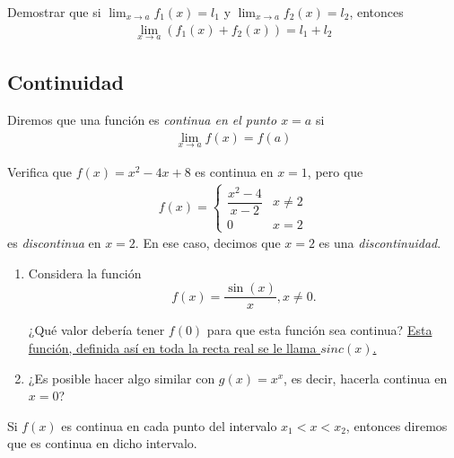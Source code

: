 \begin{resuelto}
	Demostrar que si $\lim_{x\to a}f_{1}(x)=l_{1}$ y $\lim_{x\to a}f_{2}(x)=l_{2}$, entonces
	\begin{align}
		\lim_{x\to a}\left( f_{1}(x)+f_{2}(x) \right)=l_{1}+l_{2}
	\end{align}
\end{resuelto}


\subsection{Continuidad}

  Diremos que una función es \emph{continua en el punto $x=a$} si
  \begin{align}
   \lim_{x\to a} f(x)=f(a)
   \end{align}

  \begin{resuelto}
   Verifica que $f(x)=x^{2}-4x+8$ es continua en $x=1$, pero que
   \begin{align}
   f(x)=
    \begin{cases}
\dfrac{x^2-4}{x-2}& x\neq 2\\
0 & x= 2
\end{cases}
    \end{align}
    es \emph{discontinua} en $x=2$.    En ese caso, decimos que $x=2$ es una \emph{discontinuidad}.
  \end{resuelto}

\begin{resuelto}

 \begin{enumerate}
 	\item Considera la función
 	\[ f(x) = \dfrac{\sin(x)}{x}, x\neq 0 .\]

 	¿Qué valor debería tener $ f(0) $ para que esta función sea continua? \href{https://mathworld.wolfram.com/SincFunction.html}{Esta función, definida así en toda la recta real se le llama $ sinc(x) $. }
 	\item ¿Es posible hacer algo similar con
 	$ g(x) = x^x $, es decir, hacerla continua en $ x=0 $?
 \end{enumerate}
\end{resuelto}

\begin{definicion}
	Si $f(x)$ es continua en cada punto del intervalo $x_{1}<x<x_{2}$, entonces diremos que es continua en dicho intervalo.
\end{definicion}

